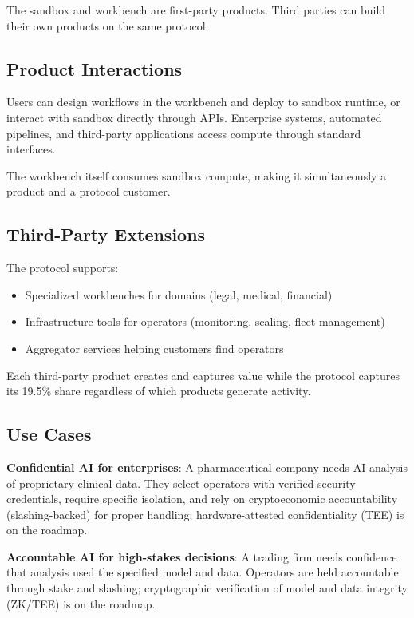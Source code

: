 \documentclass[11pt,a4paper]{article}
\begin{document}
The sandbox and workbench are first-party products. Third parties can build their own products on the same protocol.

\subsection{Product Interactions}

Users can design workflows in the workbench and deploy to sandbox runtime, or interact with sandbox directly through APIs. Enterprise systems, automated pipelines, and third-party applications access compute through standard interfaces.

The workbench itself consumes sandbox compute, making it simultaneously a product and a protocol customer.

\subsection{Third-Party Extensions}

The protocol supports:

\begin{itemize}[noitemsep]
    \item Specialized workbenches for domains (legal, medical, financial)
    \item Infrastructure tools for operators (monitoring, scaling, fleet management)
    \item Aggregator services helping customers find operators
\end{itemize}

Each third-party product creates and captures value while the protocol captures its 19.5\% share regardless of which products generate activity.

\subsection{Use Cases}

\textbf{Confidential AI for enterprises}: A pharmaceutical company needs AI analysis of proprietary clinical data. They select operators with verified security credentials, require specific isolation, and rely on cryptoeconomic accountability (slashing-backed) for proper handling; hardware-attested confidentiality (TEE) is on the roadmap.

\textbf{Accountable AI for high-stakes decisions}: A trading firm needs confidence that analysis used the specified model and data. Operators are held accountable through stake and slashing; cryptographic verification of model and data integrity (ZK/TEE) is on the roadmap.
\end{document}
